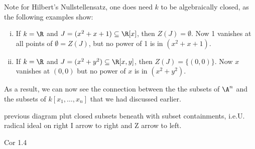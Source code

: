 Note for Hilbert's Nullstellensatz, one does need $k$ to be algebraically closed, as the following examples show:


\begin{ex} \hfill
\begin{enumerate}[(i)]
\item If $k= \R$ and $J= (x^2+x+1) \subseteq \R[x]$, then $Z(J)= \emptyset$. Now 1 vanishes at all points of $\emptyset= Z(J)$, but no power of 1 is in $(x^2+x+1)$. 

\item If $k= \R$ and $J= (x^2+y^2) \subseteq \R[x,y]$, then $Z(J)= \{(0,0)\}$. Now $x$ vanishes at $(0,0)$ but no power of $x$ is in $(x^2+y^2)$. \xqed
\end{enumerate}
\end{ex}


As a result, we can now see the connection between the the subsets of $\A^n$ and the subsets of $k[x_1,\ldots,x_n]$  that we had discussed earlier. 

previous diagram plut closed subsets beneath with subset containments, i.e.U. radical ideal on right I arrow to right and Z arrow to left. 

Cor 1.4


























